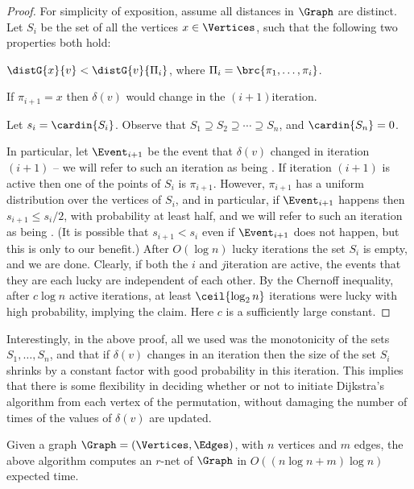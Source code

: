 \begin{proof}
    For simplicity of exposition, assume all distances in $\Graph$ are
    distinct.  Let $S_i$ be the set of all the vertices
    $x \in \Vertices$, such that the following two properties both
    hold: \medskip %
    \begin{compactenumA}
        \item $\distG{x}{v} < \distG{v}{\Pi_i}$, where
        $\Pi_i = \brc{\pi_1,\ldots, \pi_i}$.
        \smallskip%
        \item If $\pi_{i+1}=x$ then $\delta(v)$ would change in the
        $(i+1)$\th iteration.
    \end{compactenumA}
    \medskip%
    Let $s_i = \cardin{S_i}$.  Observe that
    $S_1 \supseteq S_2 \supseteq \cdots \supseteq S_n$, and
    $\cardin{S_n} = 0$.
    
    In particular, let $\Event_{i+1}$ be the event that $\delta(v)$
    changed in iteration $(i+1)$ -- we will refer to such an iteration
    as being . If iteration $(i+1)$ is active then one
    of the points of $S_i$ is $\pi_{i+1}$. However, $\pi_{i+1}$ has a
    uniform distribution over the vertices of $S_{i}$, and in
    particular, if $\Event_{i+1}$ happens then $s_{i+1} \leq s_i/2$,
    with probability at least half, and we will refer to such an
    iteration as being . (It is possible that
    $s_{i+1} < s_i$ even if $\Event_{i+1}$ does not happen, but this
    is only to our benefit.)  After $O( \log n)$ lucky iterations the
    set $S_i$ is empty, and we are done. Clearly, if both the $i$\th
    and $j$\th iteration are active, the events that they are each
    lucky are independent of each other. By the Chernoff inequality,
    after $c \log n$ active iterations, at least $\ceil{ \log_2 n }$
    iterations were lucky with high probability, implying the
    claim. Here $c$ is a sufficiently large constant.
\end{proof}

Interestingly, in the above proof, all we used was the monotonicity of
the sets $S_1, \ldots, S_n$, and that if $\delta(v)$ changes in an
iteration then the size of the set $S_i$ shrinks by a constant factor
with good probability in this iteration. This implies that there is
some flexibility in deciding whether or not to initiate Dijkstra's
algorithm from each vertex of the permutation, without damaging the
number of times of the values of $\delta(v)$ are updated.

\begin{theorem}%
    Given a graph $\Graph = (\Vertices, \Edges)$, with $n$ vertices
    and $m$ edges, the above algorithm computes an $r$-net of $\Graph$
    in $O( (n\log n+m)\log n)$ expected time.
\end{theorem}

